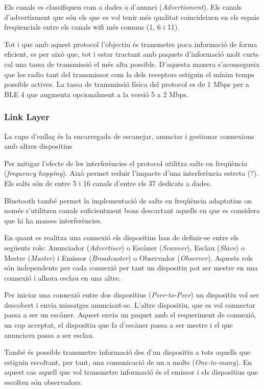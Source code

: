 Els canals es classifiquen com a dades o d'anunci (\textit{Advertisment}). Els canals d'advertisment que són els que es vol tenir més qualitat coincideixen en els espais freqüencials entre els canals wifi més comuns (1, 6 i 11).

Tot i que amb aquest protocol l'objectiu és transmetre poca informació de forma eficient, es per això que, tot i estar tractant amb paquets d'informació molt curts cal una tassa de transmissió el més alta possible. D'aquesta manera s'aconsegueix que les radio tant del transmissor com la dels receptors estiguin el mínim temps possible actives.
La tassa de transmissió física del protocol es de 1 Mbps per a BLE 4 que augmenta opcionalment a la versió 5 a 2 Mbps.


\subsubsection{Link Layer}

La capa d'enllaç és la encarregada de escanejar, anunciar i gestionar connexions amb altres dispositius

Per mitigar l'efecte de les interferències el protocol utilitza salts en freqüència (\textit{frequency hopping}). Això permet reduir l'impacte d'una interferència estreta (?). Els salts són de entre 5 i 16 canals d'entre els 37 dedicats a dades.

Bluetooth també permet la implementació de salts en freqüència adaptatius on només s'utilitzen canals suficientment bons descartant aquells en que es considera que hi ha masses interferències.

En quant es realitza una connexió els dispositius han de definir-se entre els següents rols: Anunciador (\textit{Advertiser}) o Escàner (\textit{Scanner}), Esclau (\textit{Slave}) o Mestre (\textit{Master}) i Emissor (\textit{Broadcaster}) o Observador (\textit{Observer}).
Aquests rols són independents per cada connexió per tant un dispositiu pot ser mestre en una connexió i alhora esclau en una altre.

Per iniciar una connexió entre dos dispositius (\textit{Peer-to-Peer}) un dispositiu vol ser descobert i envia missatges anunciant-se. L'altre dispositiu, que es vol connectar passa a ser un escàner. Aquest envia un paquet amb el requeriment de connexió, un cop acceptat, el dispositiu que fa d'escàner passa a ser mestre i el que anunciava passa a ser esclau.

També és possible transmetre informació des d'un dispositiu a tots aquells que estiguin escoltant, per tant, una comunicació de un a molts (\textit{One-to-many}). En aquest cas aquell que vol transmetre informació és el emissor i els dispositius que escolten són observadors.


